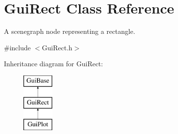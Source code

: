 \hypertarget{class_gui_rect}{\section{Gui\-Rect Class Reference}
\label{class_gui_rect}
}


A scenegraph node representing a rectangle.  




{\ttfamily \#include $<$Gui\-Rect.\-h$>$}

Inheritance diagram for Gui\-Rect\-:\begin{figure}[H]
\begin{center}
\leavevmode
\includegraphics[height=3.000000cm]{class_gui_rect}
\end{center}
\end{figure}
